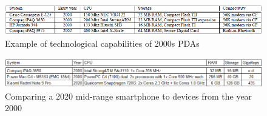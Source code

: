 \begin{figure}[!ht]
    \centering
    \includegraphics[scale=0.75]{document/chapters/chapter_1/images/pda_capabilities.png}
    \caption{Example of technological capabilities of 2000s PDAs \cite{integrating_mobile_devices_into_grid}}
    \label{fig:pda_capabilities}
\end{figure}

\begin{figure}[!ht]
    \centering
    \includegraphics[scale=0.85]{document/chapters/chapter_1/images/three_systems_comparison.png}
    \caption{Comparing a 2020 mid-range smartphone to devices from the year 2000}
    \label{fig:three_systems_comparison}
\end{figure}
